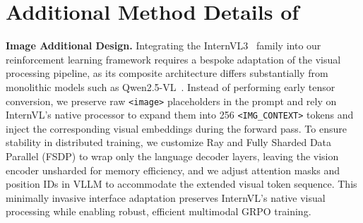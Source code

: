 \section{Additional Method Details of \ours{}}
\noindent \textbf{Image Additional Design.} 
Integrating the InternVL3~\cite{zhu2025internvl3} family into our reinforcement learning framework requires a bespoke adaptation of the visual processing pipeline, as its composite architecture differs substantially from monolithic models such as Qwen2.5-VL~\cite{bai2025qwen2}. Instead of performing early tensor conversion, we preserve raw \texttt{<image>} placeholders in the prompt and rely on InternVL's native processor to expand them into 256 \texttt{<IMG\_CONTEXT>} tokens and inject the corresponding visual embeddings during the forward pass. To ensure stability in distributed training, we customize Ray and Fully Sharded Data Parallel (FSDP) to wrap only the language decoder layers, leaving the vision encoder unsharded for memory efficiency, and we adjust attention masks and position IDs in VLLM to accommodate the extended visual token sequence. This minimally invasive interface adaptation preserves InternVL's native visual processing while enabling robust, efficient multimodal GRPO training.